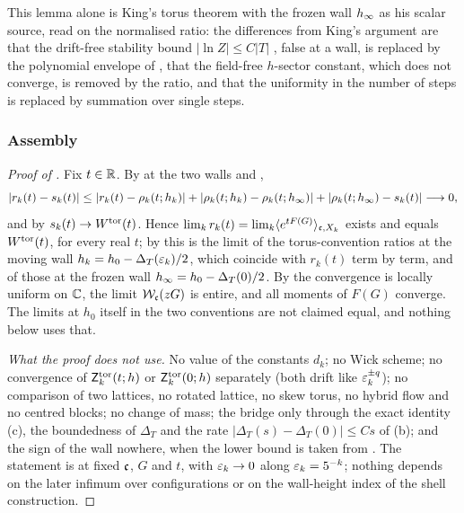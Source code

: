 This lemma alone is King's torus theorem \cite[Thm.~2.1]{K1} with the frozen wall $h_\infty$ as his scalar source, read on the normalised ratio: the differences from King's argument \cite[(3.10)--(3.13)]{K1} are that the drift-free stability bound $|\ln Z|\le C|T|$ \cite[(2.23)]{K1}, false at a wall, is replaced by the polynomial envelope of , that the field-free $h$-sector constant, which does not converge, is removed by the ratio, and that the uniformity in the number of steps is replaced by summation over single steps.

\subsubsection*{Assembly}

\begin{proof}[Proof of ]
Fix $t\in\mathbb R$. By  at the two walls and ,
\[
|r_k(t)-s_k(t)|\le|r_k(t)-\rho_k(t;h_k)|+|\rho_k(t;h_k)-\rho_k(t;h_\infty)|+|\rho_k(t;h_\infty)-s_k(t)|\longrightarrow0 ,
\]
and by  $s_k(t)\to W^{\rm tor}(t)$. Hence $\lim_kr_k(t)=\lim_k\langle e^{tF(G)}\rangle_{\mathfrak c,X_k}$ exists and equals $W^{\rm tor}(t)$, for every real $t$; by  this is the limit of the torus-convention ratios at the moving wall $h_k=h_0-\Delta_T(\varepsilon_k)/2$, which coincide with $r_k(t)$ term by term, and of those at the frozen wall $h_\infty=h_0-\Delta_T(0)/2$. By  the convergence is locally uniform on $\mathbb C$, the limit $\mathcal W_{\mathfrak c}(zG)$ is entire, and all moments of $F(G)$ converge. The limits at $h_0$ itself in the two conventions are not claimed equal, and nothing below uses that.

\emph{What the proof does not use.} No value of the constants $d_k$; no Wick scheme; no convergence of $\mathsf Z^{\rm tor}_k(t;h)$ or $\mathsf Z^{\rm tor}_k(0;h)$ separately (both drift like $\varepsilon_k^{\pm q}$); no comparison of two lattices, no rotated lattice, no skew torus, no hybrid flow and no centred blocks; no change of mass; the bridge  only through the exact identity (c), the boundedness of $\Delta_T$ and the rate $|\Delta_T(s)-\Delta_T(0)|\le Cs$ of (b); and the sign of the wall nowhere, when the lower bound is taken from . The statement is at fixed $\mathfrak c$, $G$ and $t$, with $\varepsilon_k\to0$ along $\varepsilon_k=5^{-k}$; nothing depends on the later infimum over configurations or on the wall-height index of the shell construction.
\end{proof}
